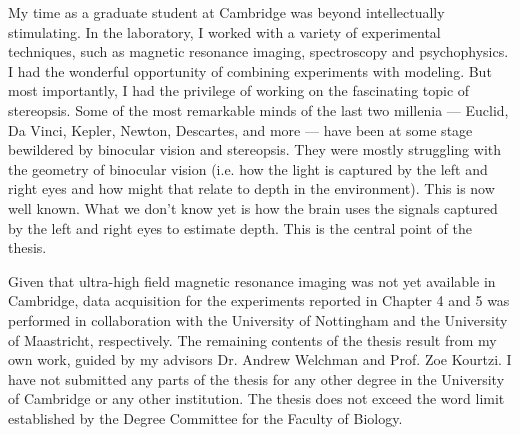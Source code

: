 
\begin{preface}      %

  My time as a graduate student at Cambridge was beyond intellectually stimulating. In the laboratory, I worked with a variety of experimental techniques, such as magnetic resonance imaging, spectroscopy and psychophysics. I had the wonderful opportunity of combining experiments with modeling. But most importantly, I had the privilege of working on the fascinating topic of stereopsis. Some of the most remarkable minds of the last two millenia --- Euclid, Da Vinci, Kepler, Newton, Descartes, and more --- have been at some stage bewildered by binocular vision and stereopsis. They were mostly struggling with the geometry of binocular vision (i.e. how the light is captured by the left and right eyes and how might that relate to depth in the environment). This is now well known. What we don't know yet is how the brain uses the signals captured by the left and right eyes to estimate depth. This is the central point of the thesis.
  
  Given that ultra-high field magnetic resonance imaging was not yet available in Cambridge, data acquisition for the experiments reported in Chapter 4 and 5 was performed in collaboration with the University of Nottingham and the University of Maastricht, respectively. The remaining contents of the thesis result from my own work, guided by my advisors Dr. Andrew Welchman and Prof. Zoe Kourtzi. I have not submitted any parts of the thesis for any other degree in the University of Cambridge or any other institution. The thesis does not exceed the word limit established by the Degree Committee for the Faculty of Biology.
  
\end{preface}


